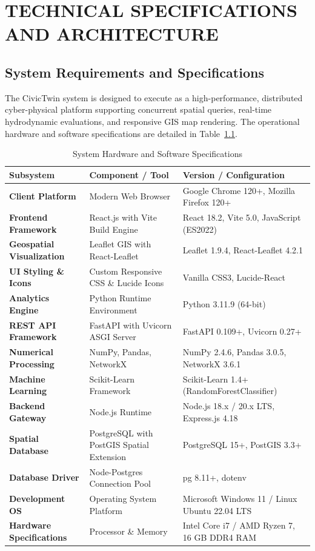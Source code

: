 \chapter{TECHNICAL SPECIFICATIONS AND ARCHITECTURE}

\section{System Requirements and Specifications}
The CivicTwin system is designed to execute as a high-performance, distributed cyber-physical platform supporting concurrent spatial queries, real-time hydrodynamic evaluations, and responsive GIS map rendering. The operational hardware and software specifications are detailed in Table~\ref{tab:system_specs}.

\begin{table}[h!]
\centering
\caption{System Hardware and Software Specifications}
\label{tab:system_specs}
\fontsize{9pt}{11pt}\selectfont
\begin{tabular}{|p{3.5cm}|p{5.5cm}|p{4.5cm}|}
\hline
\textbf{Subsystem} & \textbf{Component / Tool} & \textbf{Version / Configuration} \\
\hline
\textbf{Client Platform} & Modern Web Browser & Google Chrome 120+, Mozilla Firefox 120+ \\
\textbf{Frontend Framework} & React.js with Vite Build Engine & React 18.2, Vite 5.0, JavaScript (ES2022) \\
\textbf{Geospatial Visualization} & Leaflet GIS with React-Leaflet & Leaflet 1.9.4, React-Leaflet 4.2.1 \\
\textbf{UI Styling \& Icons} & Custom Responsive CSS \& Lucide Icons & Vanilla CSS3, Lucide-React \\
\hline
\textbf{Analytics Engine} & Python Runtime Environment & Python 3.11.9 (64-bit) \\
\textbf{REST API Framework} & FastAPI with Uvicorn ASGI Server & FastAPI 0.109+, Uvicorn 0.27+ \\
\textbf{Numerical Processing} & NumPy, Pandas, NetworkX & NumPy 2.4.6, Pandas 3.0.5, NetworkX 3.6.1 \\
\textbf{Machine Learning} & Scikit-Learn Framework & Scikit-Learn 1.4+ (RandomForestClassifier) \\
\hline
\textbf{Backend Gateway} & Node.js Runtime & Node.js 18.x / 20.x LTS, Express.js 4.18 \\
\textbf{Spatial Database} & PostgreSQL with PostGIS Spatial Extension & PostgreSQL 15+, PostGIS 3.3+ \\
\textbf{Database Driver} & Node-Postgres Connection Pool & pg 8.11+, dotenv \\
\hline
\textbf{Development OS} & Operating System Platform & Microsoft Windows 11 / Linux Ubuntu 22.04 LTS \\
\textbf{Hardware Specifications} & Processor \& Memory & Intel Core i7 / AMD Ryzen 7, 16 GB DDR4 RAM \\
\hline
\end{tabular}
\end{table}

